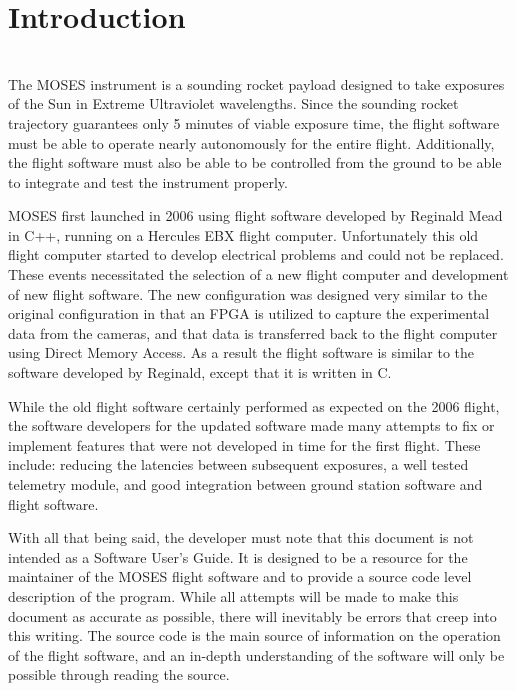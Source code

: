 \section{Introduction}
\hrulefill
\\
The MOSES instrument is a sounding rocket payload designed to take exposures of the Sun in Extreme Ultraviolet wavelengths. Since the sounding rocket trajectory guarantees only 5 minutes of viable exposure time, the flight software must be able to operate nearly autonomously for the entire flight. Additionally, the flight software must also be able to be controlled from the ground to be able to integrate and test the instrument properly.\par

MOSES first launched in 2006 using flight software developed by Reginald Mead in C++, running on a Hercules EBX flight computer. Unfortunately this old flight computer started to develop electrical problems and could not be replaced. These events necessitated the selection of a new flight computer and development of new flight software. The new configuration was designed very similar to the original configuration in that an FPGA is utilized to capture the experimental data from the cameras, and that data is transferred back to the flight computer using Direct Memory Access. As a result the flight software is similar to the software developed by Reginald, except that it is written in C. \par

While the old flight software certainly performed as expected on the 2006 flight, the software developers for the updated software made many attempts to fix or implement features that were not developed in time for the first flight. These include: reducing the latencies between subsequent exposures, a well tested telemetry module, and good integration between ground station software and flight software. \par

With all that being said, the developer must note that this document is not intended as a Software User's Guide. It is designed to be a resource for the maintainer of the MOSES flight software and to provide a source code level description of the program. While all attempts will be made to make this document as accurate as possible, there will inevitably be errors that creep into this writing. The source code is the main source of information on the operation of the flight software, and an in-depth understanding of the software will only be possible through reading the source.
